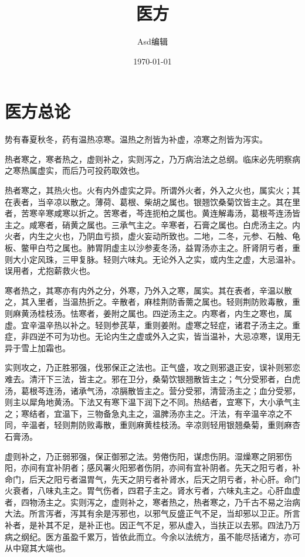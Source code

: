 \documentclass[UTF8]{ctexart}
\title{\heiti 医方}
\author{\kaishu Asd编辑}
\date{\today}
\begin{document}
\maketitle
\tableofcontents

\section{医方总论}
势有春夏秋冬，药有温热凉寒。温热之剂皆为补虚，凉寒之剂皆为泻实。

热者寒之，寒者热之，虚则补之，实则泻之，乃万病治法之总纲。临床必先明察病之寒热属虚实，而后乃可投药取效也。

热者寒之，其热火也。火有内外虚实之异。所谓外火者，外入之火也，属实火；其在表者，当辛凉以散之。薄荷、葛根、柴胡之属也。银翘饮桑菊饮皆主之。其在里者，苦寒辛寒咸寒以折之。苦寒者，芩连扼柏之属也。黄连解毒汤，葛根芩连汤皆主之。咸寒者，硝黄之属也。三承气主之。辛寒者，石膏之属也。白虎汤主之。内火者，内生之火也，乃阴血亏损，虚火妄动所致也。二地，二冬，元参、石触、龟板、鳖甲白芍之属也。肺胃阴虚主以沙参麦冬汤，益胃汤亦主之。肝肾阴亏者，重则大小定风珠，三甲复脉。轻则六味丸。无论外入之实，或内生之虚，大忌温补。误用者，尤抱薪救火也。

寒者热之，其寒亦有内外之分，外寒，乃外入之寒，属实。其在表者，辛温以散之，其入里者，当温热折之。辛散者，麻桂荆防香薷之属也。轻则荆防败毒散，重则麻黄汤桂枝汤。怯寒者，姜附之属也。四逆汤主之。内寒者，内生之寒也，属虚。宜辛温辛热以补之。轻则参芪草，重则姜附。虚寒之轻症，诸君子汤主之。重症，非四逆不可为功也。无论内生之虚或外入之实，皆当温补，大忌凉寒，误用无异于雪上加霜也。

实则攻之，乃正胜邪强，伐邪保正之法也。正气盛，攻之则邪退正安，误补则邪恋难去。清汗下三法，皆主之。邪在卫分，桑菊饮银翘散皆主之；气分受邪者，白虎汤，葛根芩连汤，诸承气汤，凉膈散皆主之。营分受邪，清营汤主之；血分受邪，则主以犀角地黄汤。下法又有寒下温下润下之不同。热结者，宜寒下，大小承气主之；寒结者，宜温下，三物备急丸主之，温脾汤亦主之。汗法，有辛温辛凉之不同，辛温者，轻则荆防败毒散，重则麻黄桂枝汤。辛凉则轻用银翘桑菊，重则麻杏石膏汤。

虚则补之，乃正弱邪强，保正御邪之法。劳倦伤阳，谋虑伤阴。湿燥寒之阴邪伤阳，亦间有宜补阴者；感风署火阳邪者伤阴，亦间有宜补阴者。先天之阳亏者，补命门，后天之阳亏者温胃气，先天之阴亏者补肾水，后天之阴亏者，补心肝。命门火衰者，八味丸主之。胃气伤者，四君子主之。肾水亏者，六味丸主之。心肝血虚者，四物汤主之。实则泻之，虚则补之，寒者热之，热者寒之，乃千古不易之治病大法。所言泻者，泻其有余是泻邪也，以邪气反盛正气不足，当却邪以卫正。所言补者，是补其不足，是补正也。因正气不足，邪从虚入，当扶正以去邪。四法乃万病之纲纪。医方虽盈千累万，皆依此而立。今余以法统方，虽不能尽括诸方，亦可从中窥其大端也。
\end{document}
